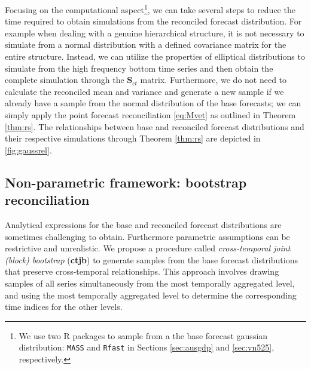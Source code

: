 \documentclass[a4paper,11pt]{article}
\newcommand{\Svet}{\bm{S}}
\theoremstyle{definition}
\begin{document}
Focusing on the computational aspect\footnote{We use two R packages to sample from a the base forecast gaussian distribution: \texttt{MASS} \citep{mass2002} and \texttt{Rfast} \citep{rfast2022} in Sections \ref{sec:ausgdp} and \ref{sec:vn525}, respectively.}, we can take several steps to reduce the time required to obtain simulations from the reconciled forecast distribution. For example when dealing with a genuine hierarchical structure, it is not necessary to simulate from a normal distribution with a defined covariance matrix for the entire structure. Instead, we can utilize the properties of elliptical distributions to simulate from the high frequency bottom time series and then obtain the complete simulation through the $\Svet_{ct}$ matrix. Furthermore, we do not need to calculate the reconciled mean and variance and generate a new sample if we already have a sample from the normal distribution of the base forecasts; we can simply apply the point forecast reconciliation \eqref{eq:Mvet} as outlined in Theorem \ref{thm:rs}. The relationships between base and reconciled forecast distributions and their respective simulations through Theorem \ref{thm:rs} are depicted in \autoref{fig:gaussrel}.

\subsection{Non-parametric framework: bootstrap reconciliation}\label{ssec:boot}

Analytical expressions for the base and reconciled forecast distributions are sometimes challenging to obtain. Furthermore parametric assumptions can be restrictive and unrealistic. We propose a procedure called \textit{cross-temporal joint (block) bootstrap} (\textbf{ctjb}) to generate samples from the base forecast distributions that preserve cross-temporal relationships. This approach involves drawing samples of all series simultaneously from the most temporally aggregated level, and using the most temporally aggregated level to determine the corresponding time indices for the other levels.
\end{document}
